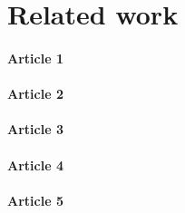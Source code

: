 \section{Related work}
\paragraph{Article 1}
\paragraph{Article 2}
\paragraph{Article 3}
\paragraph{Article 4}
\paragraph{Article 5}